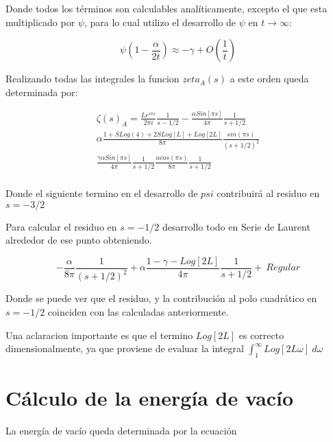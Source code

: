 Donde todos los términos son calculables analíticamente, excepto el que esta multiplicado por $\psi$, para lo cual utilizo el desarrollo de $\psi$ en $t \rightarrow \infty$:

\begin{equation}
    \psi(1-\frac{\alpha}{2 t}) \approx 
    -\gamma + O(\frac{1}{t})
\end{equation}

Realizando todas las integrales la funcion $zeta _A (s)$ a este orden queda determinada por:  

\begin{equation}
\begin{array}{c}
    \zeta (s) _{A} = 
    \frac{L e ^{i \pi s}}{2 \pi i} \frac{1}{s-1/2} 
    -\frac{\alpha Sin[\pi s]}{4 \pi} \frac{1}{s+1/2} \\
    \alpha 
    \frac{
    1+S Log(4)+2SLog[L]+Log[2L]
    }
    {8 \pi} \frac{sin(\pi s)}{(s+1/2) ^2}  \\
    \frac{\gamma \alpha Sin[\pi s]}{4 \pi } \frac{1}{s+1/2} 
    \frac{\alpha cos(\pi s) }{8 \pi}  \frac{1}{s+1/2}  \\
\end{array}
\end{equation}

Donde el siguiente termino en el desarrollo de $psi$ contribuirá al residuo en $s = -3/2$

Para calcular el residuo en $s=-1/2$ desarrollo todo en Serie de Laurent alrededor de ese punto obteniendo.

\begin{equation}
    - \frac{\alpha}{8 \pi} \frac{1}{(s+1/2)^2} + 
    \alpha \frac{1-\gamma -Log[2 L]}{4 \pi} \frac{1}{s+1/2} + \ Regular
\label{eq.desarrollo}
\end{equation}

Donde se puede ver que el residuo, y la contribución al polo cuadrático en $s=-1/2$ coinciden con las calculadas anteriormente.

Una aclaracion importante es que el termino $Log[2 L ]$ es correcto dimensionalmente, ya que proviene de evaluar la integral $\int _1 ^\infty
 Log[2 L \omega] \ d \omega$

\section{Cálculo de la energía de vacío}

La energía de vacío queda determinada por la ecuación 

